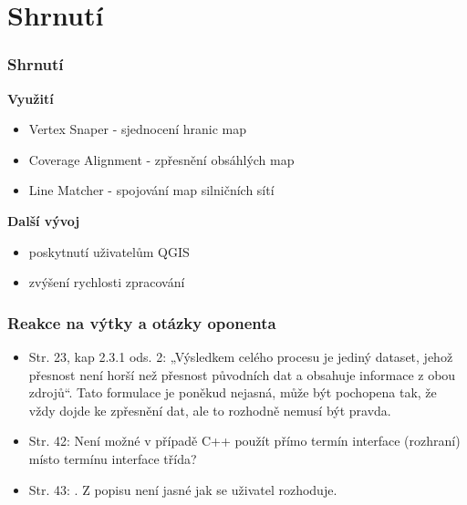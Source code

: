 \documentclass[unicode,bookmarksnumbered]{beamer}
\begin{document}
\section{Shrnutí} %
  \begin{frame}
  \frametitle{Shrnutí}
   \textbf{Využití}
     \begin{itemize}
      \item Vertex Snaper - 
	  sjednocení hranic map
      \item Coverage Alignment - 
	  zpřesnění obsáhlých map %
      \item Line Matcher - 
	  spojování map silničních sítí%
     \end{itemize}
   \textbf{Další vývoj}
     \begin{itemize}
      \item poskytnutí uživatelům QGIS
      \item zvýšení rychlosti zpracování%
     \end{itemize}
  \end{frame}
 

 \begin{frame}
  \frametitle{Reakce na výtky a otázky oponenta}
\small
     \begin{itemize}
       \item Str. 23, kap 2.3.1 ods. 2: „Výsledkem celého procesu je jediný dataset, jehož 
přesnost není horší než přesnost původních dat a obsahuje informace z obou 
zdrojů“. Tato formulace je poněkud nejasná, může být pochopena tak, že vždy 
dojde ke zpřesnění dat, ale to rozhodně nemusí být pravda. %
       \item Str. 42: Není možné v případě C++ použít přímo termín interface (rozhraní) místo 
termínu interface třída? %
       \item Str. 43: . Z popisu není jasné 
jak se uživatel rozhoduje. %
     \end{itemize}
 \end{frame}
\end{document}
